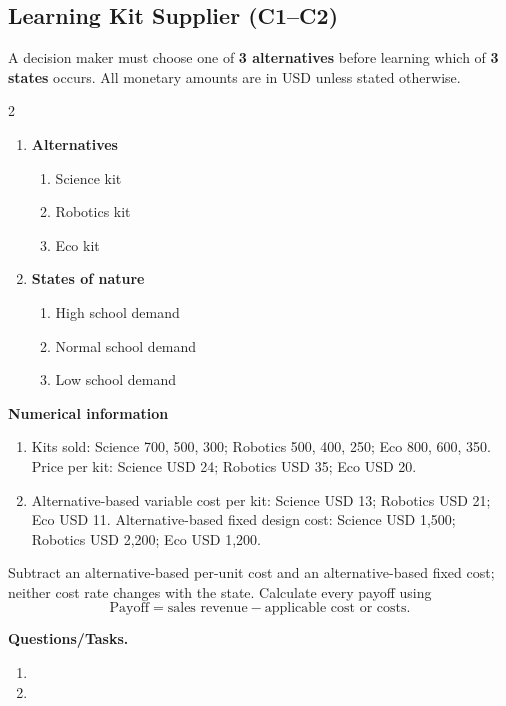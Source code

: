 \subsection{Learning Kit Supplier (C1--C2)}
\label{sec:problem14-learning-kit-supplier-c1-c2}
A decision maker must choose one of \textbf{3 alternatives} before learning which of \textbf{3 states} occurs. All monetary amounts are in USD unless stated otherwise.
\begin{multicols}{2}
\begin{enumerate}[label=\arabic*.]
 \item \textbf{Alternatives}
 \begin{enumerate}[label=\roman*)]
  \item Science kit
  \item Robotics kit
  \item Eco kit
 \end{enumerate}
 \item \textbf{States of nature}
 \begin{enumerate}[label=\roman*)]
  \item High school demand
  \item Normal school demand
  \item Low school demand
 \end{enumerate}
\end{enumerate}
\end{multicols}
 \textbf{Numerical information}
 \begin{enumerate}[label=\roman*)]
  \item Kits sold: Science 700, 500, 300; Robotics 500, 400, 250; Eco 800, 600, 350. Price per kit: Science USD 24; Robotics USD 35; Eco USD 20.
  \item Alternative-based variable cost per kit: Science USD 13; Robotics USD 21; Eco USD 11. Alternative-based fixed design cost: Science USD 1,500; Robotics USD 2,200; Eco USD 1,200.
 \end{enumerate}
Subtract an alternative-based per-unit cost and an alternative-based fixed cost; neither cost rate changes with the state. Calculate every payoff using
\[
 \text{Payoff}=\text{sales revenue}-\text{applicable cost or costs}.
\]

\textbf{Questions/Tasks.}
\begin{enumerate}[label=\textbf{\alph*)}]
 \item {}
 \item {}
\end{enumerate}
